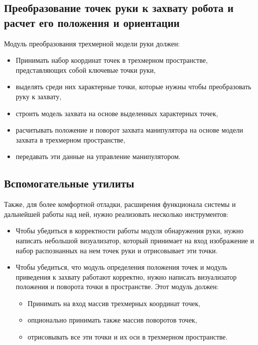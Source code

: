 \documentclass[12pt, a4paper]{article}
\begin{document}
\subsection{Преобразование точек руки к захвату робота и расчет его положения и ориентации}
Модуль преобразования трехмерной модели руки должен:
\begin{itemize}
    \item Принимать набор координат точек в трехмерном пространстве, представляющих собой ключевые точки руки,
    \item выделять среди них характерные точки, которые нужны чтобы преобразовать руку к захвату,
    \item строить модель захвата на основе выделенных характерных точек,
    \item расчитывать положение и поворот захвата манипулятора на основе модели захвата в трехмерном пространстве,
    \item передавать эти данные на управление манипулятором.
\end{itemize}

\subsection{Вспомогательные утилиты}
Также, для более комфортной отладки, расширения функционала системы и дальнейшей работы над ней, нужно реализовать несколько инструментов:
\begin{itemize}
  
  \item Чтобы убедиться в корректности работы модуля обнаружения руки, нужно
    написать небольшой визуализатор, который принимает на вход изображение и
    набор распознанных на нем точек руки и отрисовывает эти точки.

  \item Чтобы убедиться, что модуль определения положения точек и модуль
    приведения к захвату работают корректно, нужно написать визуализатор
    положения и поворота точки в пространстве. Этот модуль должен:
    \begin{itemize}
        \item Принимать на вход массив трехмерных координат точек,
        \item опционально принимать также массив поворотов точек,
        \item отрисовывать все эти точки и их оси в трехмерном пространстве.
    \end{itemize} 
\end{itemize}
\end{document}
